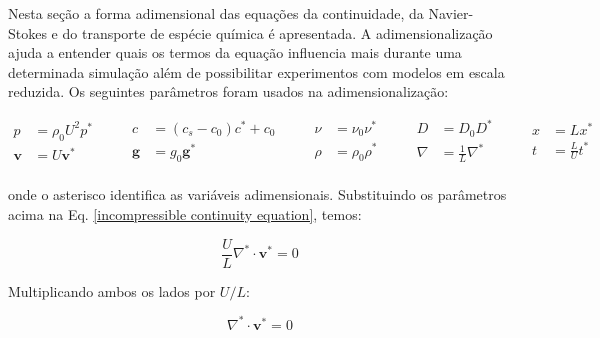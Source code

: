 Nesta seção a forma adimensional das equações
da continuidade, da Navier-Stokes e do
transporte de espécie química é apresentada.
A adimensionalização ajuda a entender quais os
termos da equação influencia mais durante uma
determinada simulação além de possibilitar
experimentos com modelos em escala reduzida. 
Os seguintes parâmetros
foram usados na adimensionalização:

\begin{equation}
 \begin{aligned}
  p & = \rho_{0} U^{2} p^{*} \\[10pt]
 \textbf{v} & = U \textbf{v}^{*} \\
 \end{aligned}
 \qquad
 \begin{aligned}
 c & = ( c_{s} - c_{0} ) c^{*} + c_{0}\\[10pt]
 \textbf{g} & = g_{0} \textbf{g}^{*} \\
 \end{aligned}
 \qquad
 \begin{aligned}
 \nu & = \nu_{0} \nu^{*} \\[10pt]
 \rho & = \rho_{0} \rho^{*} \\
 \end{aligned}
 \qquad
 \begin{aligned}
 D & = D_{0} D^{*} \\[5pt]
 \nabla & = \frac{1}{L} \nabla^{*} \\
 \end{aligned}
 \qquad
 \begin{aligned}
 x & = L x^{*} \\[5pt]
 t & = \frac{L}{U} t^{*} \\
 \end{aligned}
 \nonumber
\end{equation}


\medskip
\noindent
onde o asterisco identifica as variáveis adimensionais.
Substituindo os parâmetros acima na Eq. \ref{incompressible
continuity equation}, temos:

\begin{equation}
 \frac{U}{L} \nabla^{*} \cdot \textbf{v}^{*} = 0
\end{equation}

\medskip
\noindent
Multiplicando ambos os lados por $U/L$:

\begin{equation} \label{continuidade adimensional 1}
 \nabla^{*} \cdot \textbf{v}^{*} = 0
\end{equation}


